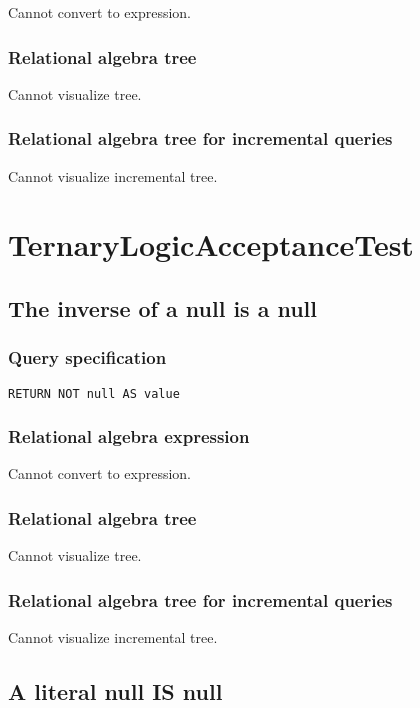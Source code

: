 Cannot convert to expression.

\subsubsection*{Relational algebra tree}

Cannot visualize tree.

\subsubsection*{Relational algebra tree for incremental queries}

Cannot visualize incremental tree.

\section{TernaryLogicAcceptanceTest}

\subsection{The inverse of a null is a null}

\subsubsection*{Query specification}

\begin{lstlisting}
RETURN NOT null AS value
\end{lstlisting}

\subsubsection*{Relational algebra expression}

Cannot convert to expression.

\subsubsection*{Relational algebra tree}

Cannot visualize tree.

\subsubsection*{Relational algebra tree for incremental queries}

Cannot visualize incremental tree.

\subsection{A literal null IS null}

